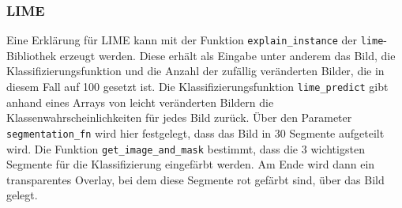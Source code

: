 \subsubsection{LIME}
Eine Erklärung für LIME kann mit der Funktion \verb|explain_instance| der \verb|lime|-Bibliothek erzeugt werden.
Diese erhält als Eingabe unter anderem das Bild, die Klassifizierungsfunktion und die Anzahl der zufällig veränderten Bilder, die in diesem Fall auf 100 gesetzt ist.
Die Klassifizierungsfunktion \verb|lime_predict| gibt anhand eines Arrays von leicht veränderten Bildern die Klassenwahrscheinlichkeiten für jedes Bild zurück.
Über den Parameter \verb|segmentation_fn| wird hier festgelegt, dass das Bild in 30 Segmente aufgeteilt wird.
Die Funktion \verb|get_image_and_mask| bestimmt, dass die 3 wichtigsten Segmente für die Klassifizierung eingefärbt werden.
Am Ende wird dann ein transparentes Overlay, bei dem diese Segmente rot gefärbt sind, über das Bild gelegt.
